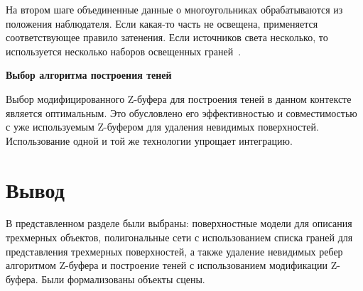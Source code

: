 На втором шаге объединенные данные о многоугольниках обрабатываются из положения наблюдателя. Если какая-то часть не освещена, применяется соответствующее правило затенения.
Если источников света несколько, то используется несколько наборов освещенных граней~\cite{letion}.

\textbf{Выбор алгоритма построения теней}

Выбор модифицированного Z-буфера для построения теней в данном контексте является оптимальным. Это обусловлено его эффективностью и совместимостью с уже используемым Z-буфером для удаления невидимых поверхностей.
Использование одной и той же технологии упрощает интеграцию.

\section*{Вывод}
В представленном разделе были выбраны: поверхностные модели для описания трехмерных объектов,  полигональные сети с использованием списка граней для представления трехмерных поверхностей, а также удаление невидимых ребер алгоритмом Z-буфера и построение теней с использованием модификации Z-буфера. Были формализованы объекты сцены.